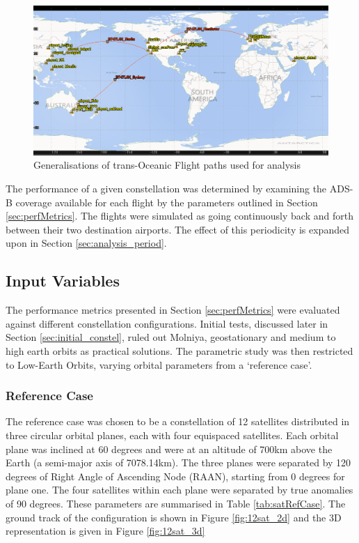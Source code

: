 \begin{figure}[H]
	\centering
	\includegraphics[scale = 0.55]{Pictures/transoceanicGeneralisations.png}
	
	\caption{Generalisations of trans-Oceanic Flight paths used for analysis}
	\label{fig:transoceanicGeneralisations}
\end{figure} 

The performance of a given constellation was determined by examining the ADS-B coverage available for each flight by the parameters outlined in Section \ref{sec:perfMetrics}. The flights were simulated as going continuously back and forth between their two destination airports. The effect of this periodicity is expanded upon in Section \ref{sec:analysis_period}.

\subsection{Input Variables}
The performance metrics presented in Section \ref{sec:perfMetrics} were evaluated against different constellation configurations. Initial tests, discussed later in Section \ref{sec:initial_constel}, ruled out Molniya, geostationary and medium to high earth orbits as practical solutions. The parametric study was then restricted to Low-Earth Orbits, varying orbital parameters from a `reference case'.

\subsubsection{Reference Case} \label{sec:ref_case}
The reference case was chosen to be a constellation of 12 satellites distributed in three circular orbital planes, each with four equispaced satellites. Each orbital plane was inclined at 60 degrees and were at an altitude of 700km above the Earth (a semi-major axis of 7078.14km). The three planes were separated by 120 degrees of Right Angle of Ascending Node (RAAN), starting from 0 degrees for plane one. The four satellites within each plane were separated by true anomalies of 90 degrees. These parameters are summarised in Table \ref{tab:satRefCase}. The ground track of the configuration is shown in Figure \ref{fig:12sat_2d} and the 3D representation is given in Figure \ref{fig:12sat_3d}

